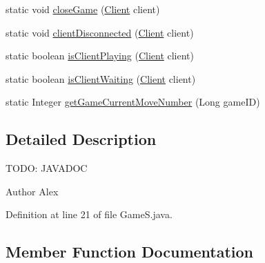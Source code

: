 \begin{DoxyCompactItemize}
\item 
static void \hyperlink{classpt_1_1up_1_1fe_1_1lpro1613_1_1server_1_1logic_1_1game_1_1_game_s_ad46d38d4c8bf34645dd93cbb2d79de12}{close\+Game} (\hyperlink{classpt_1_1up_1_1fe_1_1lpro1613_1_1server_1_1conn_1_1_client}{Client} client)
\item 
static void \hyperlink{classpt_1_1up_1_1fe_1_1lpro1613_1_1server_1_1logic_1_1game_1_1_game_s_aed1d2b65cf8abf9429c7613fb270140c}{client\+Disconnected} (\hyperlink{classpt_1_1up_1_1fe_1_1lpro1613_1_1server_1_1conn_1_1_client}{Client} client)
\item 
static boolean \hyperlink{classpt_1_1up_1_1fe_1_1lpro1613_1_1server_1_1logic_1_1game_1_1_game_s_a9da22a4fd6609b821502380c3ececb41}{is\+Client\+Playing} (\hyperlink{classpt_1_1up_1_1fe_1_1lpro1613_1_1server_1_1conn_1_1_client}{Client} client)
\item 
static boolean \hyperlink{classpt_1_1up_1_1fe_1_1lpro1613_1_1server_1_1logic_1_1game_1_1_game_s_a31685e0c50b5cda9628aab4467ef564f}{is\+Client\+Waiting} (\hyperlink{classpt_1_1up_1_1fe_1_1lpro1613_1_1server_1_1conn_1_1_client}{Client} client)
\item 
static Integer \hyperlink{classpt_1_1up_1_1fe_1_1lpro1613_1_1server_1_1logic_1_1game_1_1_game_s_af9eabf8847fec79f112b49212847a478}{get\+Game\+Current\+Move\+Number} (Long game\+ID)
\end{DoxyCompactItemize}


\subsection{Detailed Description}
T\+O\+DO\+: J\+A\+V\+A\+D\+OC \begin{DoxyAuthor}{Author}
Alex 
\end{DoxyAuthor}


Definition at line 21 of file Game\+S.\+java.



\subsection{Member Function Documentation}
\hypertarget{classpt_1_1up_1_1fe_1_1lpro1613_1_1server_1_1logic_1_1game_1_1_game_s_af7085705cb3cb78df5d0187c08a761b2}{}\label{classpt_1_1up_1_1fe_1_1lpro1613_1_1server_1_1logic_1_1game_1_1_game_s_af7085705cb3cb78df5d0187c08a761b2} 
